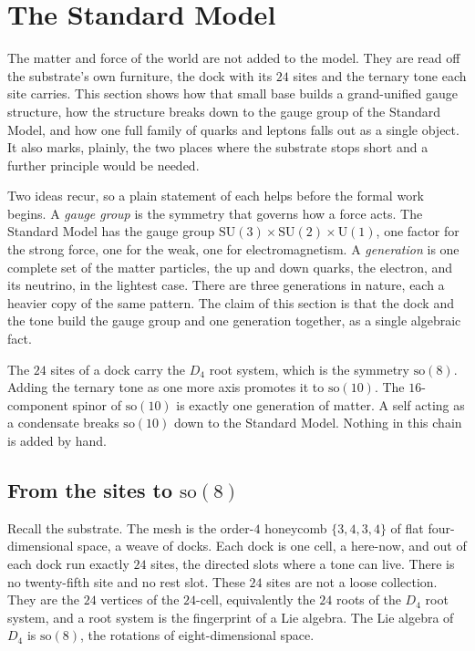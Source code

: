 \section{The Standard Model}

The matter and force of the world are not added to the model. They are read off the substrate's own furniture, the dock with its $24$ sites and the ternary tone each site carries. This section shows how that small base builds a grand-unified gauge structure, how the structure breaks down to the gauge group of the Standard Model, and how one full family of quarks and leptons falls out as a single object. It also marks, plainly, the two places where the substrate stops short and a further principle would be needed.

Two ideas recur, so a plain statement of each helps before the formal work begins. A \emph{gauge group} is the symmetry that governs how a force acts. The Standard Model has the gauge group $\mathrm{SU}(3) \times \mathrm{SU}(2) \times \mathrm{U}(1)$, one factor for the strong force, one for the weak, one for electromagnetism. A \emph{generation} is one complete set of the matter particles, the up and down quarks, the electron, and its neutrino, in the lightest case. There are three generations in nature, each a heavier copy of the same pattern. The claim of this section is that the dock and the tone build the gauge group and one generation together, as a single algebraic fact.

\begin{principle}
The $24$ sites of a dock carry the $D_4$ root system, which is the symmetry $\mathrm{so}(8)$. Adding the ternary tone as one more axis promotes it to $\mathrm{so}(10)$. The $16$-component spinor of $\mathrm{so}(10)$ is exactly one generation of matter. A self acting as a condensate breaks $\mathrm{so}(10)$ down to the Standard Model. Nothing in this chain is added by hand.
\end{principle}

\subsection{From the sites to \texorpdfstring{$\mathrm{so}(8)$}{so(8)}}

Recall the substrate. The mesh is the order-$4$ honeycomb $\{3,4,3,4\}$ of flat four-dimensional space, a weave of docks. Each dock is one cell, a here-now, and out of each dock run exactly $24$ sites, the directed slots where a tone can live. There is no twenty-fifth site and no rest slot. These $24$ sites are not a loose collection. They are the $24$ vertices of the $24$-cell, equivalently the $24$ roots of the $D_4$ root system, and a root system is the fingerprint of a Lie algebra. The Lie algebra of $D_4$ is $\mathrm{so}(8)$, the rotations of eight-dimensional space.


